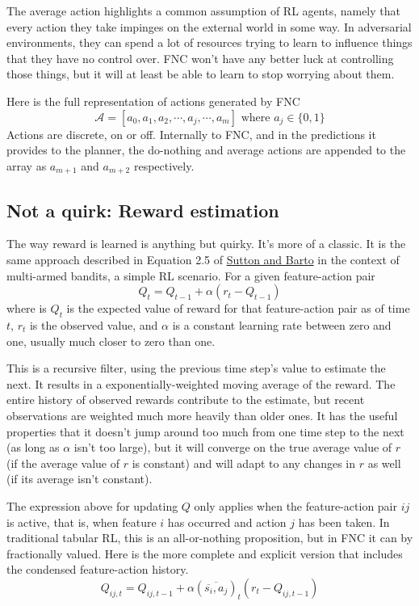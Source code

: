 The average action highlights a common assumption of RL agents, namely
that every action they take impinges on the external world in some way.
In adversarial environments, they can spend a lot of resources trying
to learn to influence things that they have no control over. FNC
won’t have any better luck at controlling those things, but it will
at least be able to learn to stop worrying about them.

Here is the full representation of actions generated by FNC 
\begin{equation}
\mathcal{A} = [a_0, a_1, a_2, \cdots, a_j, \cdots, a_m]
\mbox{ where } a_j \in \{0, 1\} 
\end{equation}
Actions are discrete, on or off. Internally to FNC, and in the predictions
it provides to the planner, the do-nothing and average actions are appended
to the array as $a_{m+1}$ and $a_{m+2}$ respectively.

\subsection*{Not a quirk: Reward estimation}
\label{algorewards}

The way reward is learned is anything but quirky. It's more of a classic.
It is the same approach described in
Equation 2.5 of \href{http://incompleteideas.net/book/RLbook2020.pdf}{Sutton and Barto}
in the context of multi-armed bandits, a simple RL scenario.
For a given feature-action pair
\begin{equation}
Q_t = Q_{t-1} + \alpha(r_t - Q_{t-1})
\end{equation}
where is $Q_t$ is the expected value of reward for that
feature-action pair as of time $t$, $r_t$ is the observed value,
and $\alpha$ is a constant learning rate between zero and one,
usually much closer to zero than one.

This is a recursive filter, using the previous time step's value to
estimate the next. It results in a exponentially-weighted moving average
of the reward. The entire history of observed rewards contribute to the
estimate, but recent observations are weighted much more heavily than older ones.
It has the useful properties that it doesn't jump around too much from one
time step to the next (as long as $\alpha$ isn't too large), but it will
converge on the true average value of $r$ (if the average value of $r$
is constant) and will adapt
to any changes in $r$ as well (if its average isn't constant).

The expression above for updating $Q$ only applies when the feature-action
pair $ij$ is active, that is, when feature $i$ has occurred and action $j$ has been
taken. In traditional tabular RL, this is an all-or-nothing proposition, but
in FNC it can by fractionally valued.
Here is the more complete
and explicit version that includes the condensed feature-action history.
\begin{equation}
Q_{ij, t} = Q_{ij, t-1} + \alpha
(\overline{\overline{s_i}, a_j})_t
(r_t - Q_{ij, t-1})
\end{equation}

